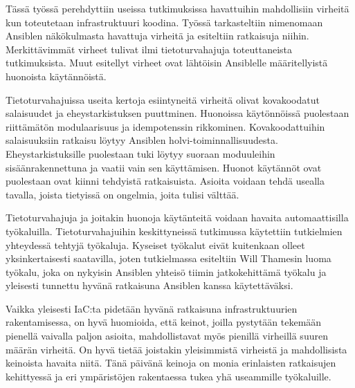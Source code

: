 Tässä työssä perehdyttiin useissa tutkimuksissa havattuihin mahdollisiin
virheitä kun toteutetaan infrastruktuuri koodina. Työssä tarkasteltiin
nimenomaan Ansiblen näkökulmasta havattuja virheitä ja esiteltiin ratkaisuja
niihin. Merkittävimmät virheet tulivat ilmi tietoturvahajuja toteuttaneista
tutkimuksista. Muut esitellyt virheet ovat lähtöisin Ansiblelle määritellyistä
huonoista käytännöistä.

Tietoturvahajuissa useita kertoja esiintyneitä virheitä olivat kovakoodatut
salaisuudet ja eheystarkistuksen puuttminen. Huonoissa käytönnöissä puolestaan
riittämätön modulaarisuus ja idempotenssin rikkominen. Kovakoodattuihin
salaisuuksiin ratkaisu löytyy Ansiblen holvi-toiminnallisuudesta.
Eheystarkistuksille puolestaan tuki löytyy suoraan moduuleihin
sisäänrakennettuna ja vaatii vain sen käyttämisen. Huonot käytännöt ovat
puolestaan ovat kiinni tehdyistä ratkaisuista. Asioita voidaan tehdä
usealla tavalla, joista tietyissä on ongelmia, joita tulisi välttää.

Tietoturvahajuja ja joitakin huonoja käytänteitä voidaan havaita
automaattisilla työkaluilla. Tietoturvahajuihin keskittyneissä
tutkimussa käytettiin tutkielmien yhteydessä tehtyjä työkaluja.
Kyseiset työkalut eivät kuitenkaan olleet yksinkertaisesti saatavilla,
joten tutkielmassa esiteltiin Will Thamesin luoma työkalu, joka on
nykyisin Ansiblen yhteisö tiimin jatkokehittämä työkalu ja yleisesti
tunnettu hyvänä ratkaisuna Ansiblen kanssa käytettäväksi.

Vaikka yleisesti IaC:ta pidetään hyvänä ratkaisuna infrastruktuurien
rakentamisessa, on hyvä huomioida, että keinot, joilla pystytään
tekemään pienellä vaivalla paljon asioita, mahdollistavat myös pienillä
virheillä suuren määrän virheitä. On hyvä tietää joistakin yleisimmistä
virheistä ja mahdollisista keinoista havaita niitä. Tänä päivänä keinoja
on monia erinlaisten ratkaisujen kehittyessä ja eri ympäristöjen rakentaessa
tukea yhä useammille työkaluille.